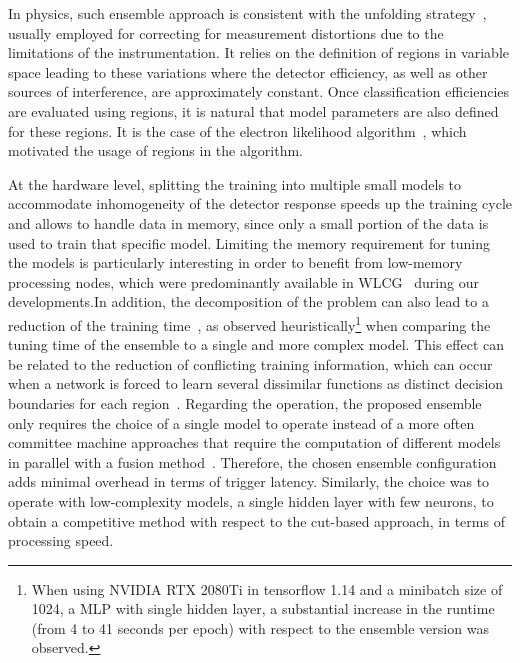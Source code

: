 In physics, such ensemble approach is consistent with the unfolding
strategy~\cite{unfolding_book}, usually employed for correcting for
measurement distortions due to the limitations of the instrumentation. It relies
on the definition of regions in variable space leading to these
variations where the detector efficiency, as well as other
sources of interference, are approximately constant. Once classification
efficiencies are evaluated using regions, it is natural that model parameters
are also defined for these regions. It is the case of the electron likelihood
algorithm~\cite{atlas_electron_id_offline}, which motivated the usage of
\eteta{} regions in the \rnn{} algorithm.



At the hardware level, splitting the training into multiple small models to accommodate inhomogeneity of the detector response speeds up the training cycle and allows to handle data in memory, since only a small portion of the data is used to train that specific model. Limiting the memory requirement for tuning
the models is particularly interesting in order to benefit from low-memory 
 processing nodes, which were predominantly available in 
WLCG~\cite{2015_lcg_tdr} during our
developments.\@ In addition, the decomposition of the problem can also lead to a
reduction of the training time~\cite{Polikar2006}, as observed heuristically\footnote{
  When using NVIDIA RTX 2080Ti in tensorflow 1.14 and a minibatch size of 1024, a 
  MLP with single hidden layer, a substantial increase in the runtime (from 4 
  to 41 seconds per epoch) with respect to the ensemble version was observed.} when
comparing the tuning time of the ensemble to a single and more complex model.
This effect can be related to the reduction of conflicting training information,
which can occur when a network is forced to learn several dissimilar functions
as distinct decision boundaries for each region~\cite{Auda1999,haykin_2008}.
Regarding the operation, the proposed ensemble only requires the choice of a
single model to operate instead of a more often committee machine approaches
that require the computation of different models in parallel with a fusion
method~\cite{zhou_ensemble}.  Therefore, the chosen ensemble configuration adds
minimal overhead in terms of trigger latency. Similarly, the choice was to
operate with low-complexity models, a single hidden layer with few neurons, to obtain a competitive method with respect to the cut-based
approach, in terms of processing speed.



